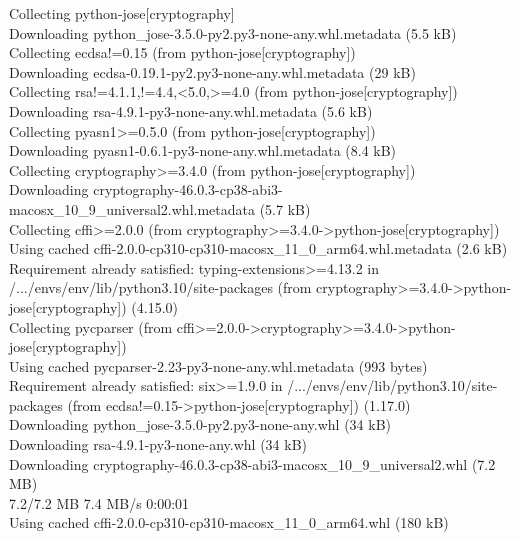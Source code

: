 \documentclass[12pt, a4paper]{article}
\begin{document}
\begin{monoblock}
            Collecting python-jose[cryptography] \\
              Downloading python\_jose-3.5.0-py2.py3-none-any.whl.metadata (5.5 kB) \\
            Collecting ecdsa!=0.15 (from python-jose[cryptography]) \\
              Downloading ecdsa-0.19.1-py2.py3-none-any.whl.metadata (29 kB) \\
            Collecting rsa!=4.1.1,!=4.4,<5.0,>=4.0 (from python-jose[cryptography]) \\
              Downloading rsa-4.9.1-py3-none-any.whl.metadata (5.6 kB) \\
            Collecting pyasn1>=0.5.0 (from python-jose[cryptography]) \\
              Downloading pyasn1-0.6.1-py3-none-any.whl.metadata (8.4 kB) \\
            Collecting cryptography>=3.4.0 (from python-jose[cryptography]) \\
              Downloading cryptography-46.0.3-cp38-abi3-macosx\_10\_9\_universal2.whl.metadata (5.7 kB) \\
            Collecting cffi>=2.0.0 (from cryptography>=3.4.0->python-jose[cryptography]) \\
              Using cached cffi-2.0.0-cp310-cp310-macosx\_11\_0\_arm64.whl.metadata (2.6 kB) \\
            Requirement already satisfied: typing-extensions>=4.13.2 in /.../envs/env/lib/python3.10/site-packages (from cryptography>=3.4.0->python-jose[cryptography]) (4.15.0) \\
            Collecting pycparser (from cffi>=2.0.0->cryptography>=3.4.0->python-jose[cryptography]) \\
              Using cached pycparser-2.23-py3-none-any.whl.metadata (993 bytes) \\
            Requirement already satisfied: six>=1.9.0 in /.../envs/env/lib/python3.10/site-packages (from ecdsa!=0.15->python-jose[cryptography]) (1.17.0) \\
            Downloading python\_jose-3.5.0-py2.py3-none-any.whl (34 kB) \\
            Downloading rsa-4.9.1-py3-none-any.whl (34 kB) \\
            Downloading cryptography-46.0.3-cp38-abi3-macosx\_10\_9\_universal2.whl (7.2 MB) \\
            7.2/7.2 MB 7.4 MB/s  0:00:01 \\
            Using cached cffi-2.0.0-cp310-cp310-macosx\_11\_0\_arm64.whl (180 kB) \\

\end{monoblock}
\end{document}
